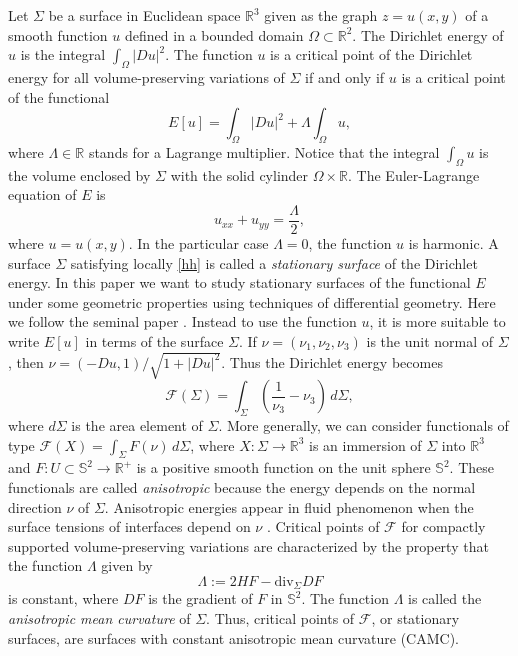 \documentclass[12pt,a4paper,reqno]{amsart}
\def\r{\mathbb R}
\def\s{\mathbb S}
\begin{document}
Let $\Sigma $ be a surface in Euclidean space $\r^3$ given as the graph $z=u(x,y)$ of a smooth function $u$ defined in a bounded domain   $\Omega\subset\r^2$. The Dirichlet energy of $u$ is the integral $\int_\Omega|Du|^2$. The function $u$ is a critical point of the Dirichlet energy for all   volume-preserving variations of $\Sigma$ if and only if $u$   is a critical point of the functional 
$$E[u]=\int_\Omega|Du|^2+\Lambda\int_\Omega u,$$
where  $\Lambda\in\r$ stands for a Lagrange multiplier. Notice that the integral $\int_\Omega u$ is the volume enclosed by $\Sigma$ with the solid cylinder $\Omega\times\r$. The Euler-Lagrange equation of $E$ is 
\begin{equation}\label{hh}
u_{xx}+u_{yy}=\frac{\Lambda}{2},
\end{equation}
 where $u=u(x,y)$. In the particular case $\Lambda=0$,  the function $u$ is harmonic. A surface $\Sigma$ satisfying locally \eqref{hh} is  called a {\it stationary surface} of the Dirichlet energy. In this paper we want to study stationary surfaces   of the functional $E$ under some geometric properties using techniques of differential geometry. Here we follow the seminal paper  \cite{re}. Instead to use the function $u$, it is more suitable to write $E[u]$  in terms of the surface $\Sigma$. If $\nu =(\nu_1,\nu_2,\nu_3)$  is the unit normal of $\Sigma$, then $\nu=(-Du,1)/\sqrt{1+|Du|^2}$. Thus the Dirichlet energy becomes
\begin{equation}\label{fu}
\mathcal{F}(\Sigma)=\int_\Sigma \left(\dfrac{1}{\nu_3}-\nu_3\right)\, d\Sigma,
\end{equation}
 where $d\Sigma$ is the area element of $\Sigma$.  More generally, we can consider   functionals    of type  $\mathcal{F}(X)=\int_\Sigma F(\nu)\, d\Sigma$, where $X\colon\Sigma\to\r^3$ is an immersion of  $\Sigma$ into $\r^3$ and $F\colon U\subset\s^2\to\r^+$ is a positive smooth function on the unit sphere $\s^2$. These functionals are called {\it anisotropic} because  the energy depends on the normal direction $\nu$ of $\Sigma$. Anisotropic energies appear in fluid phenomenon when the surface tensions of interfaces  depend  on $\nu$ \cite{ta}.  Critical points of   $\mathcal{F}$ for compactly supported volume-preserving variations are characterized by the property that the function $\Lambda$ given by 
$$\Lambda:= 2HF-\mbox{div}_\Sigma DF$$
 is constant, where $DF$ is the gradient of $F$ in $\s^2$. The   function $\Lambda$ is called the {\it anisotropic mean curvature} of   $\Sigma$. Thus, critical points of $\mathcal{F}$, or stationary surfaces, are surfaces with constant anisotropic mean curvature (CAMC).
 
\end{document}
